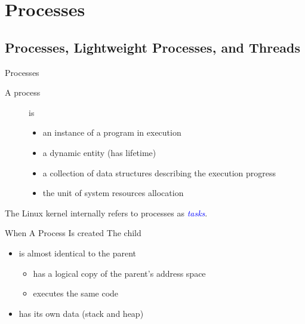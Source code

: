 \mode*
{}

\section{Processes}

\subsection{Processes, Lightweight Processes, and Threads}

\begin{frame}{Processes}
  \begin{description}
  \item[A process] is
    \begin{itemize}
    \item an instance of a program in execution
    \item a dynamic entity (has lifetime)
    \item a collection of data structures describing the execution progress
    \item the unit of system resources allocation
    \end{itemize}
  \end{description}
  The Linux kernel internally refers to processes as \textcolor{blue}{\emph{tasks}}.
\end{frame}

\begin{frame}{When A Process Is created}
  The child
  \begin{itemize}
  \item is almost identical to the parent
    \begin{itemize}
    \item has a logical copy of the parent's address space
    \item executes the same code
    \end{itemize}
  \item has its own data (stack and heap)
  \end{itemize}
\end{frame}

